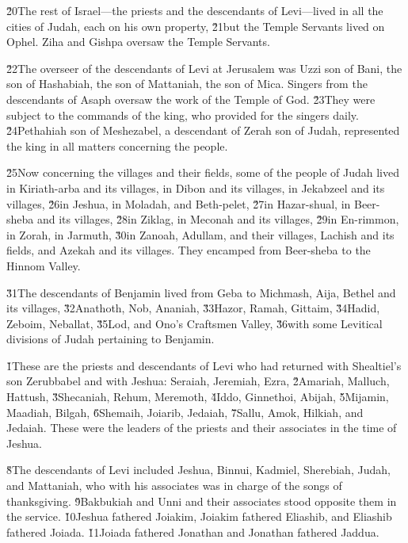 \v{20}The rest of Israel---the priests and the descendants of Levi---lived in all the cities of Judah, each on his own property, \v{21}but the Temple Servants lived on Ophel. Ziha and Gishpa oversaw the Temple Servants.

\v{22}The overseer of the descendants of Levi at Jerusalem was Uzzi son of Bani, the son of Hashabiah, the son of Mattaniah, the son of Mica. Singers from the descendants of Asaph oversaw the work of the Temple of God. \v{23}They were subject to the commands of the king, who provided for the singers daily. \v{24}Pethahiah son of Meshezabel, a descendant of Zerah son of Judah, represented the king in all matters concerning the people.

\v{25}Now concerning the villages and their fields, some of the people of Judah lived in Kiriath-arba and its villages, in Dibon and its villages, in Jekabzeel and its villages, \v{26}in Jeshua, in Moladah, and Beth-pelet, \v{27}in Hazar-shual, in Beer-sheba and its villages, \v{28}in Ziklag, in Meconah and its villages, \v{29}in En-rimmon, in Zorah, in Jarmuth, \v{30}in Zanoah, Adullam, and their villages, Lachish and its fields, and Azekah and its villages. They encamped from Beer-sheba to the Hinnom Valley.

\v{31}The descendants of Benjamin lived from Geba to Michmash, Aija, Bethel and its villages, \v{32}Anathoth, Nob, Ananiah, \v{33}Hazor, Ramah, Gittaim, \v{34}Hadid, Zeboim, Neballat, \v{35}Lod, and Ono's Craftsmen Valley, \v{36}with some Levitical divisions of Judah pertaining to Benjamin.

\v{1}These are the priests and descendants of Levi who had returned with Shealtiel's son Zerubbabel and with Jeshua: Seraiah, Jeremiah, Ezra, \v{2}Amariah, Malluch, Hattush, \v{3}Shecaniah, Rehum, Meremoth, \v{4}Iddo, Ginnethoi, Abijah, \v{5}Mijamin, Maadiah, Bilgah, \v{6}Shemaih, Joiarib, Jedaiah, \v{7}Sallu, Amok, Hilkiah, and Jedaiah. These were the leaders of the priests and their associates in the time of Jeshua.

\v{8}The descendants of Levi included Jeshua, Binnui, Kadmiel, Sherebiah, Judah, and Mattaniah, who with his associates was in charge of the songs of thanksgiving. \v{9}Bakbukiah and Unni and their associates stood opposite them in the service. \v{10}Jeshua fathered Joiakim, Joiakim fathered Eliashib, and Eliashib fathered Joiada. \v{11}Joiada fathered Jonathan and Jonathan fathered Jaddua.

